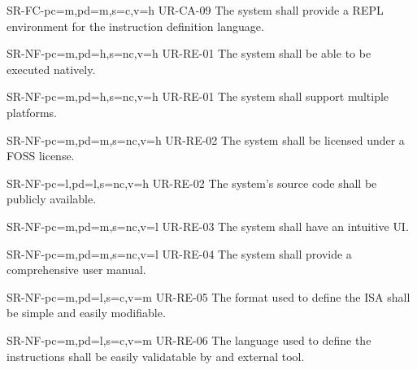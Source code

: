 \begin{softwareReq}{SR-FC-}{pc=m,pd=m,s=c,v=h}
  {UR-CA-09}
  The system shall provide a \gls{REPL environment} for the instruction definition language.
\end{softwareReq}


\setcounter{i}{1}

\begin{softwareReq}{SR-NF-}{pc=m,pd=h,s=nc,v=h}
  {UR-RE-01}
  The system shall be able to be executed natively.
\end{softwareReq}

\begin{softwareReq}{SR-NF-}{pc=m,pd=h,s=nc,v=h}
  {UR-RE-01}
  The system shall support multiple platforms.
\end{softwareReq}

\begin{softwareReq}{SR-NF-}{pc=m,pd=m,s=nc,v=h}
  {UR-RE-02}
  The system shall be licensed under a \gls{FOSS} license.
\end{softwareReq}

\begin{softwareReq}{SR-NF-}{pc=l,pd=l,s=nc,v=h}
  {UR-RE-02}
  The system's source code shall be publicly available.
\end{softwareReq}

\begin{softwareReq}{SR-NF-}{pc=m,pd=m,s=nc,v=l}
  {UR-RE-03}
  The system shall have an intuitive \gls{UI}.
\end{softwareReq}

\begin{softwareReq}{SR-NF-}{pc=m,pd=m,s=nc,v=l}
  {UR-RE-04}
  The system shall provide a comprehensive user manual.
\end{softwareReq}

\begin{softwareReq}{SR-NF-}{pc=m,pd=l,s=c,v=m}
  {UR-RE-05}
  The format used to define the \gls{ISA} shall be simple and easily modifiable.
\end{softwareReq}

\begin{softwareReq}{SR-NF-}{pc=m,pd=l,s=c,v=m}
  {UR-RE-06}
  The language used to define the instructions shall be easily validatable by and external tool.
\end{softwareReq}


